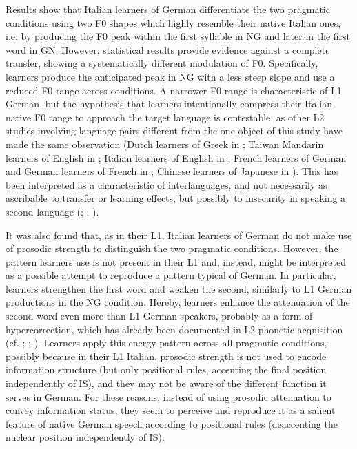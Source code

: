 Results show that Italian learners of German differentiate the two pragmatic conditions using two F0 shapes which highly resemble their native Italian ones, i.e. by producing the F0 peak within the first syllable in NG and later in the first word in GN. However, statistical results provide evidence against a complete transfer, showing a systematically different modulation of F0. Specifically, learners produce the anticipated peak in NG with a less steep slope and use a reduced F0 range across conditions. A narrower F0 range is characteristic of L1 German, but the hypothesis that learners intentionally compress their Italian native F0 range to approach the target language is contestable, as other L2 studies involving language pairs different from the one object of this study have made the same observation (Dutch learners of Greek in \citealt{Mennen1998}; Taiwan Mandarin learners of English in \citealt{ViscegliaEtAl2011}; Italian learners of English in \citealt{Urbani2012}; French learners of German and German learners of French in \citealt{ZimmererEtAl2014}; Chinese learners of Japanese in \citealt{ZhangXie2014}). This has been interpreted as a characteristic of interlanguages, and not necessarily as ascribable to transfer or learning effects, but possibly to insecurity in speaking a second language (\citealt{Mennen1998}; \citealt{ZhangXie2014}; \citealt{ZimmererEtAl2014}).

It was also found that, as in their L1, Italian learners of German do not make use of prosodic strength to distinguish the two pragmatic conditions. However, the pattern learners use is not present in their L1 and, instead, might be interpreted as a possible attempt to reproduce a pattern typical of German. In particular, learners strengthen the first word and weaken the second, similarly to L1 German productions in the NG condition. Hereby, learners enhance the attenuation of the second word even more than L1 German speakers, probably as a form of hypercorrection, which has already been documented in L2 phonetic acquisition (cf. \citealt{IversonSong2013}; \citealt{Kelly2022}; \citealt{Petrov2021}). Learners apply this energy pattern across all pragmatic conditions, possibly because in their L1 Italian, prosodic strength is not used to encode information structure (but only positional rules, accenting the final position independently of IS), and they may not be aware of the different function it serves in German. For these reasons, instead of using prosodic attenuation to convey information status, they seem to perceive and reproduce it as a salient feature of native German speech according to positional rules (deaccenting the nuclear position independently of IS).

